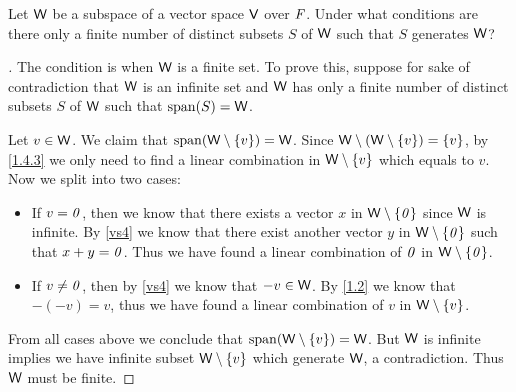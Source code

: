 \begin{ex}\label{ex:1.4.17}
	Let \(\mathsf{W}\) be a subspace of a vector space \(\mathsf{V}\) over \(\mathit{F}\).
	Under what conditions are there only a finite number of distinct subsets \(S\) of \(\mathsf{W}\) such that \(S\) generates \(\mathsf{W}\)?
\end{ex}

\begin{proof}[]
	The condition is when \(\mathsf{W}\) is a finite set.
	To prove this, suppose for sake of contradiction that \(\mathsf{W}\) is an infinite set and \(\mathsf{W}\) has only a finite number of distinct subsets \(S\) of \(\mathsf{W}\) such that \(\spn{S} = \W\).

	Let \(v \in \mathsf{W}\).
	We claim that \(\spn{\W \setminus \set{v}} = \W\).
	Since \(\mathsf{W} \setminus (\mathsf{W} \setminus \left\lbrace v\right\rbrace) = \left\lbrace v\right\rbrace\), by \cref{1.4.3} we only need to find a linear combination in \(\mathsf{W} \setminus \left\lbrace v\right\rbrace\) which equals to \(v\).
	Now we split into two cases:
	\begin{itemize}
		\item If \(v = \mathit{0}\), then we know that there exists a vector \(x\) in \(\mathsf{W} \setminus \left\lbrace\mathit{0}\right\rbrace\) since \(\mathsf{W}\) is infinite.
		      By \ref{vs4} we know that there exist another vector \(y\) in \(\mathsf{W} \setminus \left\lbrace\mathit{0}\right\rbrace\) such that \(x + y = \mathit{0}\).
		      Thus we have found a linear combination of \(\mathit{0}\) in \(\mathsf{W} \setminus \left\lbrace\mathit{0}\right\rbrace\).
		\item If \(v \neq \mathit{0}\), then by \ref{vs4} we know that \(-v \in \mathsf{W}\).
		      By \cref{1.2} we know that \(-(-v) = v\), thus we have found a linear combination of \(v\) in \(\mathsf{W} \setminus \left\lbrace v\right\rbrace\).
	\end{itemize}
	From all cases above we conclude that \(\spn{\W \setminus \set{v}} = \W\).
	But \(\mathsf{W}\) is infinite implies we have infinite subset \(\mathsf{W} \setminus \left\lbrace v\right\rbrace\) which generate \(\mathsf{W}\), a contradiction.
	Thus \(\mathsf{W}\) must be finite.
\end{proof}
